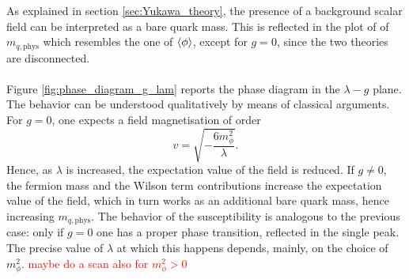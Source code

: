 As explained in section \ref{sec:Yukawa_theory}, the presence of a background scalar field can be interpreted as a bare quark mass. This is reflected in the plot of of $m_{q, \text{phys}}$ which resembles the one of $\left\langle \phi \right\rangle$, except for $g=0$, since the two theories are disconnected. \\~\\
Figure \ref{fig:phase_diagram_g_lam} reports the phase diagram in the $\lambda - g$ plane. The behavior can be understood qualitatively by means of classical arguments. 
For $g=0$, one expects a field magnetisation of order 
\begin{equation*}
    v = \sqrt{-\frac{6 m_\phi^2}{\lambda}}.
\end{equation*}
Hence, as $\lambda$ is increased, the expectation value of the field is reduced.
If $g \neq 0$, the fermion mass and the Wilson term contributions increase the expectation value of the field, which in turn works as an additional bare quark mass, hence increasing $m_{q, \text{phys}}$. The behavior of the susceptibility is analogous to the previous case: only if $g=0$ one has a proper phase transition, reflected in the single peak.
The precise value of $\lambda$ at which this happens depends, mainly, on the choice of $m_\phi^2$. \textcolor{red}{maybe do a scan also for $m_\phi^2 > 0$}
